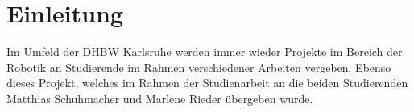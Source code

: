 \chapter{Einleitung}
Im Umfeld der \ac{DHBW} Karlsruhe werden immer wieder Projekte im Bereich der Robotik an Studierende im Rahmen verschiedener Arbeiten vergeben. Ebenso dieses Projekt, welches im Rahmen der Studienarbeit an die beiden Studierenden Matthias Schuhmacher und Marlene Rieder übergeben wurde. 
